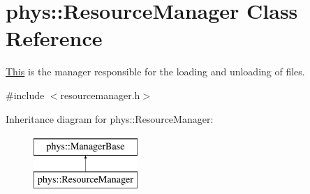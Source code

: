\hypertarget{classphys_1_1ResourceManager}{
\section{phys::ResourceManager Class Reference}
\label{d1/d35/classphys_1_1ResourceManager}
}


\hyperlink{structThis}{This} is the manager responsible for the loading and unloading of files.  




{\ttfamily \#include $<$resourcemanager.h$>$}

Inheritance diagram for phys::ResourceManager:\begin{figure}[H]
\begin{center}
\leavevmode
\includegraphics[height=2cm]{d1/d35/classphys_1_1ResourceManager}
\end{center}
\end{figure}
